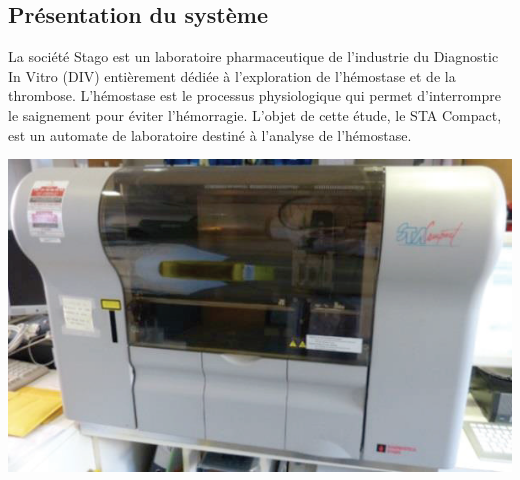 \documentclass[10pt,fleqn]{article} %
\begin{document}

\vspace{5cm}
\pagestyle{fancy}
\thispagestyle{plain}

\def\columnseprulecolor{\color{ocre}}
\setlength{\columnseprule}{0.4pt} 


\begin{multicols}{2}

\subsection*{Présentation du système}


La société Stago est un laboratoire pharmaceutique de
l'industrie du Diagnostic In Vitro (DIV) entièrement
dédiée à l'exploration de l'hémostase et de la thrombose.
L'hémostase est le processus physiologique qui permet
d'interrompre le saignement pour éviter l'hémorragie.
L’objet de cette étude, le STA Compact, est un
automate de laboratoire destiné à l’analyse de
l’hémostase.
\begin{center}
\includegraphics[width=.8\linewidth]{images/ccp_01}
\end{center}



\end{multicols}
\end{document}
